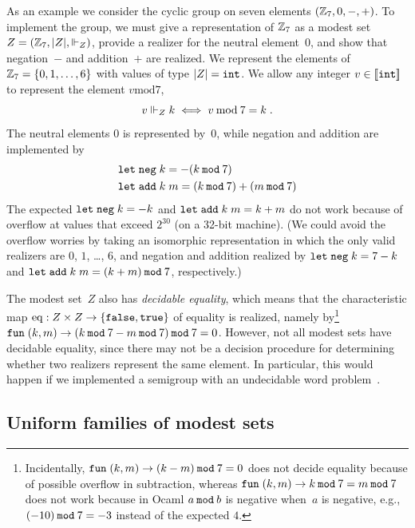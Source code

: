 \bigskip

As an example we consider the cyclic group on seven elements $(\mathbb{Z}_7,
0, {-}, {+})$. To implement the group, we must give a representation
of $\mathbb{Z}_7$ as a modest set~$Z = (\mathbb{Z}_7, |Z|, {\Vdash_Z})$, provide
a realizer for the neutral element~$0$, and show that negation~$-$ and
addition~$+$ are realized. We represent the elements of~$\mathbb{Z}_7 =
\{0, 1, \ldots, 6\}$ with values of type $|Z| = \mathtt{int}$. We
allow any integer $v \in [\![\mathtt{int}]\!]$ to represent the element $v
\mathbin{\mathrm{mod}} 7$,
%
\begin{equation*}
  v \Vdash_Z k \iff v \mathbin{\mathrm{mod}} 7 = k \;.
\end{equation*}
%
The neutral elements $0$ is represented by~$0$, while negation and
addition are implemented by
%
\begin{align*}
  &\mathtt{let}\;\mathtt{neg}\; k = -(k \mathbin{\mathtt{mod}} 7) \\
  &\mathtt{let}\;\mathtt{add}\; k\; m = (k \mathbin{\mathtt{mod}} 7) + (m \mathbin{\mathtt{mod}} 7)
\end{align*}
%
The expected $\mathtt{let}\;\mathtt{neg}\; k = -k$ and $\mathtt{let}\;\mathtt{add}\;
  k\; m = k+m$ do not work because of overflow at values that exceed
$2^{30}$ (on a 32-bit machine). (We could avoid the overflow worries
by taking an isomorphic representation in which the only valid
realizers are $0$, $1$, \ldots, $6$, and negation and addition
realized by $\mathtt{let}\;\mathtt{neg}\; k = 7 - k$ and $\mathtt{let}\;\mathtt{add}\;
  k\; m = (k + m) \mathbin{\mathtt{mod}} 7$, respectively.)

The modest set~$Z$ also has \emph{decidable equality}, which means
that the characteristic map $\mathrm{eq} : Z \times Z \to
\{\mathtt{false}, \mathtt{true}\}$ of equality is realized, namely
by\footnote{Incidentally, $\mathtt{fun}\;(k,m) \to (k - m) \mathbin{\mathtt{mod}} 7 = 0$ does not
  decide equality because of possible overflow in subtraction, whereas
  $\mathtt{fun}\;(k,m) \to k \mathbin{\mathtt{mod}} 7 = m \mathbin{\mathtt{mod}} 7$ does not work because in Ocaml
  $a \mathbin{\mathtt{mod}} b$ is negative when~$a$ is negative, e.g., $(-10) \mathbin{\mathtt{mod}} 7 =
  -3$ instead of the expected $4$.} $\mathtt{fun}\;(k,m) \to (k \mathbin{\mathtt{mod}} 7 - m \mathbin{\mathtt{mod}}
  7) \mathbin{\mathtt{mod}} 7 = 0$. However, not all modest sets have decidable
equality, since there may not be a decision procedure for determining
whether two realizers represent the same element. In particular, this
would happen if we implemented a semigroup with an undecidable word
problem~\cite{post47:_recur_unsol_probl_thue}.


\subsection{Uniform families of modest sets}
\label{sec:uniform-families}

